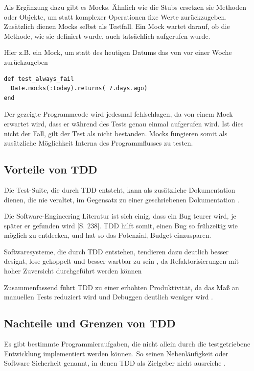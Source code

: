   Als Ergänzung dazu gibt es Mocks. Ähnlich wie die Stubs ersetzen sie Methoden oder Objekte, um statt komplexer Operationen fixe Werte zurückzugeben. Zusätzlich dienen Mocks selbst als Testfall. Ein Mock wartet darauf, ob die Methode, wie sie definiert wurde, auch tatsächlich aufgerufen wurde.
  
  Hier z.B. ein Mock, um statt des heutigen Datums das von vor einer Woche zurückzugeben
  \begin{lstlisting}
def test_always_fail
  Date.mocks(:today).returns( 7.days.ago)
end
  \end{lstlisting}
  Der gezeigte Programmcode wird jedesmal fehlschlagen, da von einem Mock erwartet wird, dass er während des Tests genau einmal aufgerufen wird. Ist dies nicht der Fall, gilt der Test als nicht bestanden. Mocks fungieren somit als zusätzliche Möglichkeit Interna des Programmflusses zu testen. 


  
  \subsection{Vorteile von TDD}
   
  Die Test-Suite, die durch TDD entsteht, kann als zusätzliche Dokumentation dienen, die nie veraltet, im Gegensatz zu einer geschriebenen Dokumentation \citep{palermo_guidelines_2006}.
  
  Die Software-Engineering Literatur ist sich einig, dass ein Bug teurer wird, je später er gefunden wird \citep{hunt_pragmatic_1999}[S. 238]. TDD hilft somit, einen Bug so frühzeitig wie möglich zu entdecken, und hat so das Potenzial, Budget einzusparen.
  
  Softwaresysteme, die durch TDD entstehen, tendieren dazu deutlich besser designt, lose gekoppelt und besser wartbar zu sein \citep{beck_test_2002} \citep{palermo_guidelines_2006}, da Refaktorisierungen mit hoher Zuversicht durchgeführt werden können
  
  Zusammenfassend führt TDD zu einer erhöhten Produktivität, da das Maß an manuellen Tests reduziert wird und Debuggen deutlich weniger wird \citep{palermo_guidelines_2006}.
  
  \subsection{Nachteile und Grenzen von TDD}
  Es gibt bestimmte Programmieraufgaben, die nicht allein durch die testgetriebene Entwicklung implementiert werden können. So seinen Nebenläufigkeit oder Software Sicherheit genannt, in denen TDD als Zielgeber nicht ausreiche \citep[S. xii]{beck_test_2002}.
  
